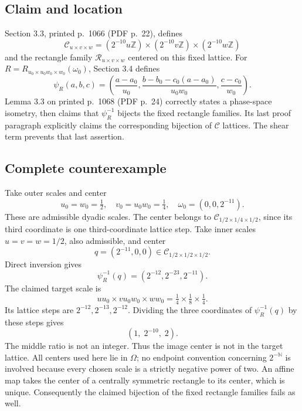 \documentclass[10pt]{article}
\begin{document}
\subsection*{Claim and location}
Section 3.3, printed p. 1066 (PDF p. 22), defines \[\mathcal C_{u\times v\times w}
=(2^{-10}u\mathbb Z)\times(2^{-10}v\mathbb Z)\times(2^{-10}w\mathbb Z)\] and the rectangle family \(\mathcal R_{u\times v\times w}\) centered on this fixed lattice. For \(R=R_{u_0\times u_0w_0\times w_0}(\omega_0)\), Section 3.4 defines \[\psi_R(a,b,c)=
\left(\frac{a-a_0}{u_0},
\frac{b-b_0-c_0(a-a_0)}{u_0w_0},
\frac{c-c_0}{w_0}\right).\] Lemma 3.3 on printed p. 1068 (PDF p. 24) correctly states a phase-space isometry, then claims that \(\psi_R^{-1}\) bijects the fixed rectangle families. Its last proof paragraph explicitly claims the corresponding bijection of \(\mathcal C\) lattices. The shear term prevents that last assertion.\par
\subsection*{Complete counterexample}
Take outer scales and center \[u_0=w_0=\tfrac12,\quad v_0=u_0w_0=\tfrac14,\quad
\omega_0=(0,0,2^{-11}).\] These are admissible dyadic scales. The center belongs to \(\mathcal C_{1/2\times1/4\times1/2}\), since its third coordinate is one third-coordinate lattice step. Take inner scales \(u=v=w=1/2\), also admissible, and center \[q=(2^{-11},0,0)\in\mathcal C_{1/2\times1/2\times1/2}.\] Direct inversion gives \[\psi_R^{-1}(q)=(2^{-12},2^{-23},2^{-11}).\] The claimed target scale is \[uu_0\times vu_0w_0\times ww_0=\tfrac14\times\tfrac18\times\tfrac14.\] Its lattice steps are \(2^{-12},2^{-13},2^{-12}\). Dividing the three coordinates of \(\psi_R^{-1}(q)\) by these steps gives \[(1,\;2^{-10},\;2).\] The middle ratio is not an integer. Thus the image center is not in the target lattice. All centers used here lie in \(\Omega\); no endpoint convention concerning \(2^{-\mathbb N}\) is involved because every chosen scale is a strictly negative power of two. An affine map takes the center of a centrally symmetric rectangle to its center, which is unique. Consequently the claimed bijection of the fixed rectangle families fails as well.\par
\end{document}
